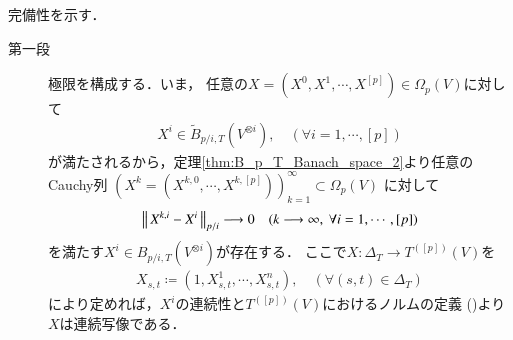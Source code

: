 	\begin{prf}完備性を示す．
		\begin{description}
			\item[第一段] 極限を構成する．いま，
			任意の$X = (X^0,X^1,\cdots,X^{[p]}) \in \Omega_p(V)$に対して
			\begin{align}
				X^i \in \tilde{B}_{p/i,T}\left( V^{\otimes i} \right),
				\quad (\forall i=1,\cdots,[p]) 
			\end{align}
			が満たされるから，定理\ref{thm:B_p_T_Banach_space_2}より任意のCauchy列
			$\left( X^k = (X^{k,0},\cdots,X^{k,[p]}) \right)_{k=1}^{\infty} \subset \Omega_p(V)$
			に対して
			\begin{align}
				\left\|\, X^{k,i} - X^i\, \right\|_{p/i} \longrightarrow 0
				\quad (k \longrightarrow \infty,\ \forall i=1,\cdots,[p])
				\label{eq:thm_p_rough_path_complete_dist_2}
			\end{align}
			を満たす$X^i \in B_{p/i,T}\left( V^{\otimes i} \right)$が存在する．
			ここで$X:\Delta_T \longrightarrow T^{([p])}(V)$を
			\begin{align}
				X_{s,t} \coloneqq (1,X^1_{s,t},\cdots,X^n_{s,t}),
				\quad (\forall (s,t) \in \Delta_T)
			\end{align}
			により定めれば，$X^i$の連続性と$T^{([p])}(V)$におけるノルムの定義
			()より
			$X$は連続写像である．
		

\end{description}
\end{prf}
